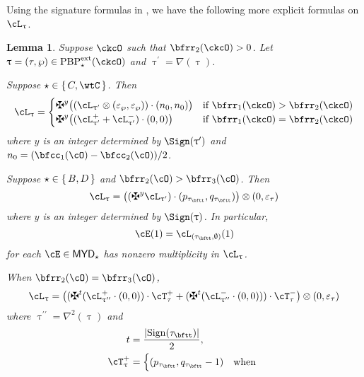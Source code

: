 \documentclass[12pt,a4paper]{amsart}
\def\abs#1{\left|{#1}\right|}
\def\MYD{{\mathsf{MYD}}}
\def\pac#1{\ac_{#1}^+}
\def\nac#1{\ac_{#1}^-}
\def\DD{\nabla}
\numberwithin{equation}{section}
\newtheorem{lem}[thm]{Lemma}
\theoremstyle{remark}
\def\ssign{\mathrm{Sign}}
\def\PBPes{\mathrm{PBP}^{\mathrm{ext}}_{\star}}
\def\pcT{\cT^+}
\def\ncT{\cT^-}
\def\uptaup{\uptau^{\prime}}
\def\uptaupp{\uptau^{\prime\prime}}
\begin{document}
Using the signature formulas in , we have the following more
explicit formulas on $\ac_{\uptau}$.
\begin{lem}\label{lem:dlift}
  Suppose $\ckcO$ such that $\bfrr_{2}(\ckcO)>0$. Let
  $\uptau = (\tau,\wp)\in \PBPes(\ckcO)$ and $\uptaup = \DD(\uptau)$.
\begin{enuma}
  \item
  Suppose $\star\in \set{C,\wtC}$.  Then
  \begin{equation}\label{eq:C}
    \ac_{\uptau}=
    \begin{cases}
      \maltese^{y}\big( (\ac_{\uptau'}\lotimes (\varepsilon_{\wp},\varepsilon_{\wp}))
      \cdot (n_{0},n_{0})\big) & \text{if } \bfrr_{1}(\ckcO)>\bfrr_{2}(\ckcO)\\
      \maltese^{y}\big( (\pac{\uptau'} + \nac{\uptaup})\cdot (0,0) \big)
      & \text{if } \bfrr_{1}(\ckcO)=\bfrr_{2}(\ckcO)
    \end{cases}
  \end{equation}
  where $y$ is an integer determined by $\Sign(\uptaup)$ and $n_{0} = (\bfcc_{1}(\cO)-\bfcc_{2}(\cO))/2$.
  \item
  Suppose $\star\in \set{B,D}$ and $\bfrr_{2}(\cO)>\bfrr_{3}(\cO)$. Then
  \begin{equation}\label{eq:BD}
    \ac_{\uptau}= \big((\maltese^{y}\ac_{\uptau'})\cdot (p_{\tau_{\bftt}},q_{\tau_{\bftt}})\big)
    \lotimes (0,\varepsilon_{\tau})
  \end{equation}
  where $y$ is an integer determined by $\Sign(\uptau)$.
  In particular,
  \begin{equation}\label{eq:TBD}
    \cE(1) = \ac_{(\tau_{\bftt},\emptyset)}(1)
  \end{equation}
  for each $\cE\in \MYD_\star$ has nonzero multiplicity in $\ac_{\uptau}$.
  \item
  When  $\bfrr_{2}(\cO)=\bfrr_{3}(\cO)$,
  \begin{equation}\label{eq:BD2}
    \ac_{\uptau} =
    \big((\maltese^t (\pac{\uptaupp}\cdot (0,0)) \cdot \pcT_{\tau}
    +  (\maltese^t(\nac{\uptaupp}\cdot (0,0)) ) \cdot \ncT_{\tau}\big)\lotimes(0,\varepsilon_{\tau})
  \end{equation}
  where $\uptaupp = \DD^{2}(\uptau)$ and
  \[
  \begin{split}
    t &  = \frac{\abs{\ssign(\tau_{\bftt})}}{2},\\
    \pcT_{\uptau}& = \begin{cases} (p_{\tau_{\bftt}},q_{\tau_{\bftt}}-1) & \text{when
}
\end{cases}
\end{split}\]
\end{enuma}
\end{lem}
\end{document}
